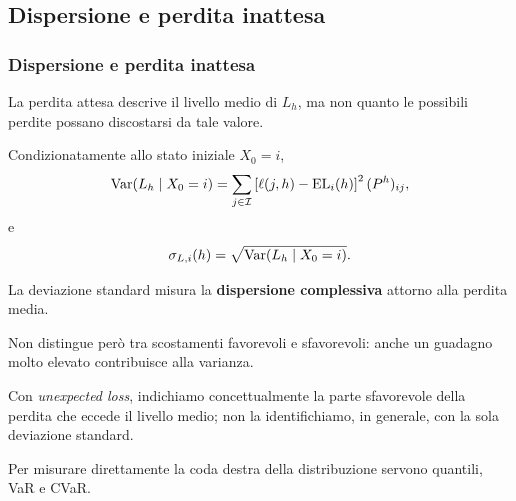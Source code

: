 

\subsection{Dispersione e perdita inattesa}%

\begin{frame}%
%

\frametitle{Dispersione e perdita inattesa}%
%

%


La perdita attesa descrive il livello medio di $L_{h}$, ma non quanto le
possibili perdite possano discostarsi da tale valore.

\medskip

Condizionatamente allo stato iniziale $X_{0}=i$,
\[
\Var(L_{h}\mid X_{0}=i) = \sum_{j\in\mathcal{I}} \left[  \ell(j,h)-\mathrm{EL}%
_{i}(h) \right]  ^{2} (P^{h})_{ij},
\]
e
\[
\sigma_{L,i}(h) = \sqrt{\operatorname{Var}(L_{h}\mid X_{0}=i)}.
\]




\begin{stepitemize}
\item La deviazione standard misura la \textbf{dispersione complessiva}
attorno alla perdita media.

\item Non distingue per\`{o} tra scostamenti favorevoli e sfavorevoli: anche
un guadagno molto elevato contribuisce alla varianza.

\item Con \emph{unexpected loss}, indichiamo concettualmente la parte
sfavorevole della perdita che eccede il livello medio; non la identifichiamo,
in generale, con la sola deviazione standard.

\item Per misurare direttamente la coda destra della distribuzione servono
quantili, VaR e CVaR.
\end{stepitemize}

%

\transboxout
\end{frame}%


